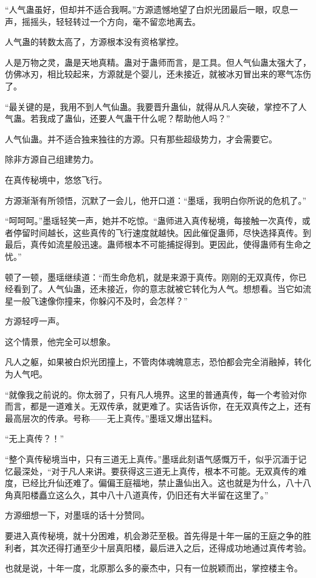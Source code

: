 \begin{this_body}
“人气蛊虽好，但却并不适合我啊。”方源遗憾地望了白炽光团最后一眼，叹息一声，摇摇头，轻轻转过一个方向，毫不留恋地离去。

人气蛊的转数太高了，方源根本没有资格掌控。

人是万物之灵，蛊是天地真精。蛊对于蛊师而言，是工具。但人气仙蛊太强大了，仿佛冰刃，相比较起来，方源就是个婴儿，还未接近，就被冰刃冒出来的寒气冻伤了。

“最关键的是，我用不到人气仙蛊。我要晋升蛊仙，就得从凡人突破，掌控不了人气蛊。若我成了蛊仙，还要人气蛊干什么呢？帮助他人吗？”

人气仙蛊。并不适合独来独往的方源。只有那些超级势力，才会需要它。

除非方源自己组建势力。

在真传秘境中，悠悠飞行。

方源渐渐有所领悟，沉默了一会儿，他开口道：“墨瑶，我明白你所说的危机了。”

“呵呵呵。”墨瑶轻笑一声，她并不吃惊。“蛊师进入真传秘境，每接触一次真传，或者停留时间越长，这些真传的飞行速度就越快。因此催促蛊师，尽快选择真传。到最后，真传如流星般迅速。蛊师根本不可能捕捉得到。更因此，使得蛊师有生命之忧。”

顿了一顿，墨瑶继续道：“而生命危机，就是来源于真传。刚刚的无双真传，你已经看到了。人气仙蛊，还未接近，你的意志就被它转化为人气。想想看。当它如流星一般飞速像你撞来，你躲闪不及时，会怎样？”

方源轻哼一声。

这个情景，他完全可以想象。

凡人之躯，如果被白炽光团撞上，不管肉体魂魄意志，恐怕都会完全消融掉，转化为人气吧。

“就像我之前说的。你太弱了，只有凡人境界。这里的普通真传，每一个考验对你而言，都是一道难关。无双传承，就更难了。实话告诉你，在无双真传之上，还有最高层次的传承。号称——无上真传。”墨瑶又爆出猛料。

“无上真传？！”

“整个真传秘境当中，只有三道无上真传。”墨瑶此刻语气感慨万千，似乎沉湎于记忆最深处，“对于凡人来讲。要获得这三道无上真传，根本不可能。无双真传的难度，已经比升仙还难了。偏偏王庭福地，禁止蛊仙出入。这也就是为什么，八十八角真阳楼矗立这么久，其中八十八道真传，仍旧还有大半留在这里了。”

方源细想一下，对墨瑶的话十分赞同。

要进入真传秘境，就十分困难，机会渺茫至极。首先得是十年一届的王庭之争的胜利者，其次还得打通至少十层真阳楼，最后进入之后，还得成功地通过真传考验。

也就是说，十年一度，北原那么多的豪杰中，只有一位脱颖而出，掌控楼主令。


\end{this_body}
